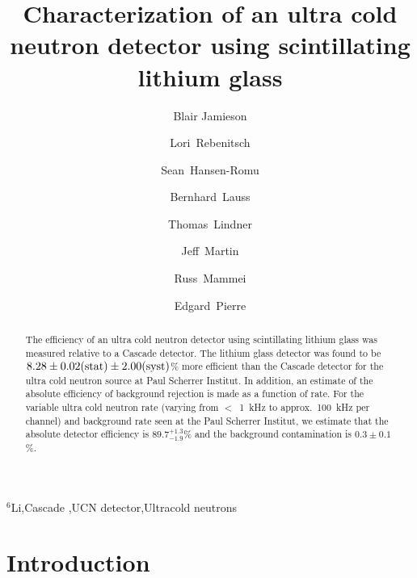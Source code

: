\documentclass[review]{elsarticle}
\begin{document}
\begin{frontmatter}

\title{Characterization of an ultra cold neutron detector using scintillating lithium glass}



\author[aWpg]{Blair Jamieson}
\author[aWpg]{Lori~Rebenitsch}
\author[aWpg]{Sean~Hansen-Romu}
\author[aPSI]{Bernhard~Lauss}
\author[aTRIUMF,aWpg]{Thomas~Lindner}
\author[aWpg]{Jeff~Martin}
\author[aWpg]{Russ~Mammei}
\author[aRCNP,aTRIUMF]{Edgard~Pierre}


\address[aWpg]{University of Winnipeg}
\address[aPSI]{Paul Scherrer Institut}
\address[aTRIUMF]{TRIUMF}
\address[aRCNP]{Research Centre for Nuclear Physics, Osaka University}


\begin{abstract}
The efficiency of an ultra cold neutron detector using scintillating
lithium glass was measured relative to a Cascade detector.  The
lithium glass detector was found to be $8.28 \pm 0.02 {\rm(stat)} \pm
2.00 {\rm(syst)}$\% more efficient than the Cascade detector for the
ultra cold neutron source at Paul Scherrer Institut.  In addition, an
estimate of the absolute efficiency of background rejection is made as
a function of rate.  For the variable ultra cold neutron rate (varying
from $<$~1~kHz to approx.\ 100~kHz per channel) and background rate
seen at the Paul Scherrer Institut, we estimate that the absolute
detector efficiency is $89.7^{+1.3}_{-1.9}$\% and the background
contamination is $0.3\pm0.1$\%.

\end{abstract}

\begin{keyword}
$^6$Li\sep Cascade \sep UCN detector\sep Ultracold neutrons 
\end{keyword}

\end{frontmatter}

\linenumbers


\section{Introduction}
\end{document}
